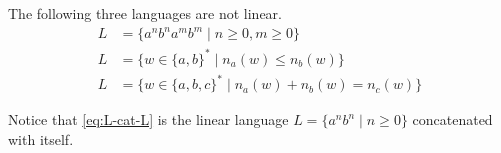 \documentclass{article}
\begin{document}
The following three languages are not linear.
\begin{align}
    L & = \{ a^n b^n a^m b^m \mid n \geq 0, m \geq 0 \}\label{eq:L-cat-L} \\
    L & = \{ w \in {\{a, b\}}^* \mid n_a(w) \leq n_b(w) \}                \\
    L & = \{ w \in {\{a, b, c\}}^* \mid n_a(w) + n_b(w) = n_c(w) \}
\end{align}

Notice that \autoref{eq:L-cat-L} is the linear language $L = \{a^n b^n \mid n \geq 0 \}$ concatenated with itself.

\end{document}
